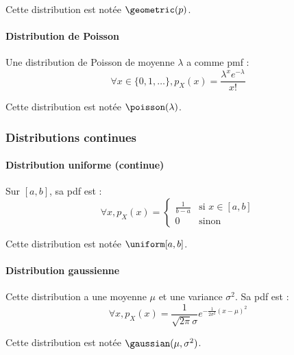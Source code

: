             Cette distribution est notée \(\geometric(p)\).

        \paragraph{Distribution de Poisson}
            Une distribution de Poisson de moyenne \(\lambda\) a comme pmf :
            \[
                \forall x \in \{0, 1, \dots\}, p_X(x) = \frac{\lambda^x e^{-\lambda}}{x!}
            \]

            Cette distribution est notée \(\poisson(\lambda)\).

    \subsubsection{Distributions continues}
        \paragraph{Distribution uniforme (continue)}
            Sur \([a, b]\), sa pdf est :
            \[
                \forall x, p_X(x) = \begin{cases}
                    \frac{1}{b - a} & \text{si } x \in [a, b]\\
                    0 & \text{sinon}
                \end{cases}
            \]

            Cette distribution est notée \(\uniform[a, b]\).

        \paragraph{Distribution gaussienne}
            Cette distribution a une moyenne \(\mu\) et une variance \(\sigma^2\). Sa pdf est :
            \[
                \forall x, p_X(x) = \frac{1}{\sqrt{2\pi}\sigma} e^{-\frac{1}{2\sigma^2}(x - \mu)^2}
            \]

            Cette distribution est notée \(\gaussian(\mu, \sigma^2)\).